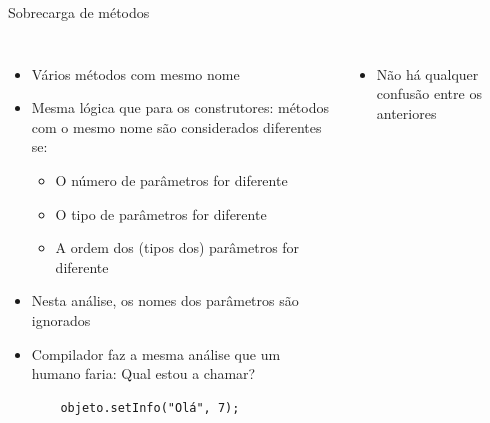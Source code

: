 \documentclass[portuguese, aspectratio=169, xcolor=table]{beamer}
\begin{document}
\begin{frame}[fragile]{Sobrecarga de métodos}
\begin{columns}
\begin{itemize}
\item Vários métodos com mesmo nome
\item Mesma lógica que para os construtores: métodos com o mesmo nome são considerados diferentes se:
\begin{itemize}
\item O número de parâmetros for diferente
\item O tipo de parâmetros for diferente
\item A ordem dos (tipos dos) parâmetros for diferente
\end{itemize}
\item Nesta análise, os nomes dos parâmetros são ignorados
\item Compilador faz a mesma análise que um humano faria: Qual estou a chamar?
\begin{verbatim}
    objeto.setInfo("Olá", 7);
\end{verbatim}
\end{itemize}
\begin{itemize}

\begin{verbatim}
void setInfo(String) {
}

void setInfo(String, String) {
}

void setInfo(String, int) {
}

void setInfo(int, String) {
}
\end{verbatim}
\item Não há qualquer confusão entre os anteriores
\end{itemize}
\end{columns}
\end{frame}
\end{document}
